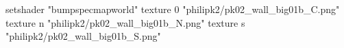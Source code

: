 setshader "bumpspecmapworld"
    texture 0 "philipk2/pk02_wall_big01b_C.png"
    texture n "philipk2/pk02_wall_big01b_N.png"
    texture s "philipk2/pk02_wall_big01b_S.png"